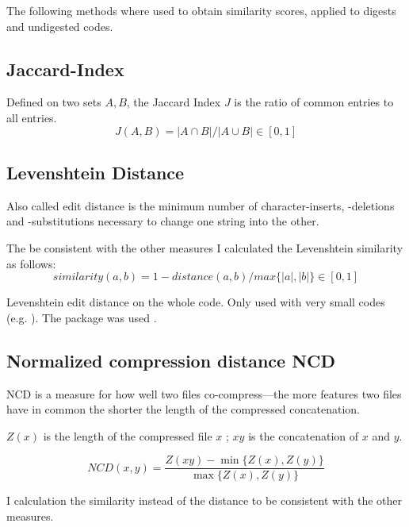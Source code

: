 \documentclass[../main.tex]{subfiles}
\begin{document}
The following methods where used to obtain similarity scores, applied to digests and undigested codes.

\subsection{Jaccard-Index \label{sec:jacc}}

Defined on two sets \(A, B\), the Jaccard Index \(J\) is the ratio of common entries to all entries.
\begin{equation}
  J(A,B) = |A \cap B| / |A \cup B| \in [0,1]
  \label{eq:jaccard}
\end{equation}

\subsection{Levenshtein Distance \label{sec:lev}}

Also called edit distance is the minimum number of character-inserts, -deletions and -substitutions necessary to change one string into the other.

The be consistent with the other measures I calculated the Levenshtein similarity as follows:
\begin{equation}
  similarity(a, b) = 1 - distance(a, b) / max\{|a|, |b|\} \in [0,1]
  \label{eq:levSim}
\end{equation}

Levenshtein edit distance on the whole code. Only used with very small codes (e.g. ).
The  package  was used \cite{pyLev}.

\subsection{Normalized compression distance NCD \label{sec:ncd}}

NCD is a measure for how well two files co-compress---the more features two files have in common the shorter the length of the compressed concatenation.

$Z(x)$ is the length of the compressed file $x$ ; $xy$ is the concatenation of $x$ and $y$.

\begin{equation}
  NCD(x,y) = \dfrac{Z(xy) - \min \{Z(x),Z(y)\}}{\max \{Z(x),Z(y)\}}
\end{equation}

I calculation the similarity instead of the distance to be consistent with the other measures.
\end{document}
